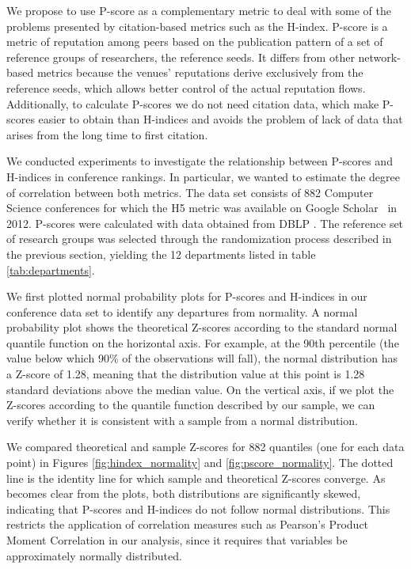 \documentclass[man,floatsintext]{apa6}
\let\footnote\endnote
\begin{document}
We propose to use P-score as a complementary metric to deal with some of the problems
presented by citation-based metrics such as the H-index.
P-score is a metric of reputation among peers based on the publication pattern of a set of
reference groups of researchers, the reference seeds. It differs from other network-based 
metrics because the venues' reputations derive exclusively from the reference seeds, which 
allows better control of the actual reputation flows. Additionally, to calculate P-scores we 
do not need citation data, which make P-scores easier to obtain than H-indices and avoids 
the problem of lack of data that arises from the long time to first citation.

We conducted experiments to investigate the relationship between P-scores and H-indices
in conference rankings. In particular, we wanted to estimate the degree of correlation between both metrics. The data set consists of 882 Computer Science conferences
for which the H5 metric was available on Google Scholar~\footnote{https://scholar.google.com.br/}
in 2012. P-scores were calculated with
data obtained from DBLP \footnote{http://dblp.uni-trier.de/}. The reference set of research groups
was selected through the randomization process described in the previous section, 
yielding the 12 departments listed in table \ref{tab:departments}.

We first plotted normal probability plots for P-scores and H-indices in our conference data set 
to identify any departures from normality. A normal probability plot shows the theoretical Z-scores
according to the standard normal quantile function on the horizontal axis. For example, at the 90th
percentile (the value below which 90\% of the observations will fall), the normal distribution has a
Z-score of 1.28, meaning that the distribution value at this point is 1.28 standard deviations above the median value. On the vertical axis, if
we plot the Z-scores according to the quantile function described by our sample, we can verify
whether it is consistent with a sample from a normal distribution.

We compared theoretical and sample Z-scores for 882 quantiles (one for each data point) in Figures
\ref{fig:hindex_normality} and \ref{fig:pscore_normality}. The dotted line is the identity line for
which sample and theoretical Z-scores converge. As becomes clear from the plots, both distributions
are significantly skewed, indicating that P-scores and H-indices do not follow normal
distributions. This restricts the application of correlation measures such as Pearson's Product 
Moment Correlation in our analysis, since it requires that variables be approximately normally 
distributed. 
\end{document}
